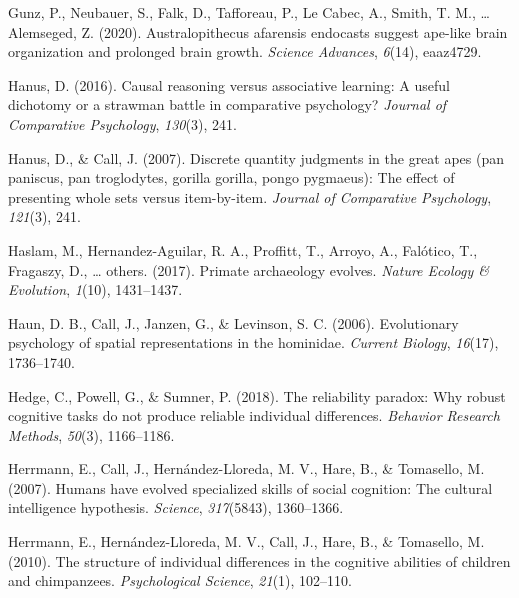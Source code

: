 \documentclass[
  man,floatsintext]{apa6}
\newlength{\cslhangindent}
\newlength{\cslentryspacingunit} %
\newenvironment{CSLReferences}[2] %
 {%
  \setlength{\parindent}{0pt}
  \ifodd #1
  \let\oldpar\par
  \def\par{\hangindent=\cslhangindent\oldpar}
  \fi
  \setlength{\parskip}{#2\cslentryspacingunit}
 }%
 {}
\begin{document}
\begin{CSLReferences}{1}{0}
\leavevmode{}%
Gunz, P., Neubauer, S., Falk, D., Tafforeau, P., Le Cabec, A., Smith, T. M., \ldots{} Alemseged, Z. (2020). Australopithecus afarensis endocasts suggest ape-like brain organization and prolonged brain growth. \emph{Science Advances}, \emph{6}(14), eaaz4729.

\leavevmode{}%
Hanus, D. (2016). Causal reasoning versus associative learning: A useful dichotomy or a strawman battle in comparative psychology? \emph{Journal of Comparative Psychology}, \emph{130}(3), 241.

\leavevmode{}%
Hanus, D., \& Call, J. (2007). Discrete quantity judgments in the great apes (pan paniscus, pan troglodytes, gorilla gorilla, pongo pygmaeus): The effect of presenting whole sets versus item-by-item. \emph{Journal of Comparative Psychology}, \emph{121}(3), 241.

\leavevmode{}%
Haslam, M., Hernandez-Aguilar, R. A., Proffitt, T., Arroyo, A., Falótico, T., Fragaszy, D., \ldots{} others. (2017). Primate archaeology evolves. \emph{Nature Ecology \& Evolution}, \emph{1}(10), 1431--1437.

\leavevmode{}%
Haun, D. B., Call, J., Janzen, G., \& Levinson, S. C. (2006). Evolutionary psychology of spatial representations in the hominidae. \emph{Current Biology}, \emph{16}(17), 1736--1740.

\leavevmode{}%
Hedge, C., Powell, G., \& Sumner, P. (2018). The reliability paradox: Why robust cognitive tasks do not produce reliable individual differences. \emph{Behavior Research Methods}, \emph{50}(3), 1166--1186.

\leavevmode{}%
Herrmann, E., Call, J., Hernández-Lloreda, M. V., Hare, B., \& Tomasello, M. (2007). Humans have evolved specialized skills of social cognition: The cultural intelligence hypothesis. \emph{Science}, \emph{317}(5843), 1360--1366.

\leavevmode{}%
Herrmann, E., Hernández-Lloreda, M. V., Call, J., Hare, B., \& Tomasello, M. (2010). The structure of individual differences in the cognitive abilities of children and chimpanzees. \emph{Psychological Science}, \emph{21}(1), 102--110.


\end{CSLReferences}
\end{document}
